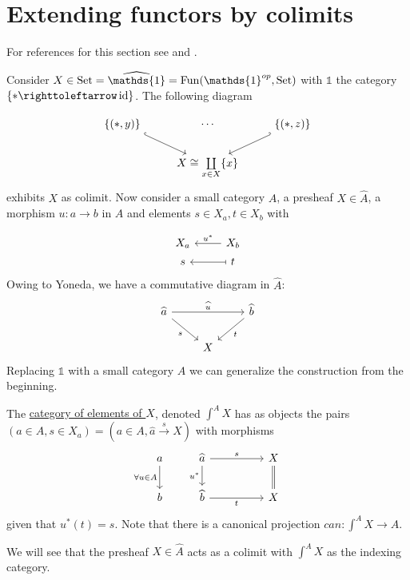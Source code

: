 \setcounter{section}{4}
\section{Extending functors by colimits}

For references for this section see \cite[Section 6.2]{LeinBasi2014} and \cite[Section 1.1]{Cisinski_2019}.

Consider $X\in\Set = \widehat{\mathds{1}}=\Fun(\mathds{1}^{op},\Set)$ with $\mathds{1}$  the category $\{\ast\righttoleftarrow \id\}$. The following diagram

\[\begin{tikzcd}
\{(\ast,y)\} \arrow[rd, hook] & \cdots                      & \{(\ast,z)\} \arrow[ld, hook'] \\
                 & X\cong\coprod\limits_{x\in X}\{x\} &                 
\end{tikzcd}\]
exhibits $X$ as colimit. Now consider a small category $A$, a presheaf $X\in \widehat{A}$, a morphism $u\colon a \to b$ in $A$ and elements $s\in X_a, t\in X_b$ with

\[
    \begin{tikzcd}[row sep= 2pt]
    X_a & X_b \arrow[l, "u^*"'] \\
    s   & t \arrow[l, maps to] 
    \end{tikzcd}
\]
Owing to Yoneda, we have a commutative diagram in $\widehat{A}$:
\[
\begin{tikzcd}
\widehat{a} \arrow[rd, "s"'] \arrow[rr, "\widehat{u}"] &   & \widehat{b} \arrow[ld, "t"] \\
                                               & X &                        
\end{tikzcd}
\]
Replacing $\mathds{1}$ with a small category $A$ we can generalize the construction from the beginning.
\begin{defi}
    The \underline{category of elements of $X$}, denoted $\int^A X$ has as objects the pairs $(a\in A, s\in X_a)=(a\in A, \widehat{a}\xrightarrow{s} X)$ with morphisms
    \[
        \begin{tikzcd}
        a \arrow[d, "\forall u\in A"'] & \widehat{a} \arrow[rr, "s"] \arrow[d, "u^*"'] && X \arrow[d, Rightarrow, no head] \\
        b                              & \widehat{b} \arrow[rr, "t"']                      && X                               
        \end{tikzcd}
    \]
    given that $u^*(t)=s.$ Note that there is a canonical projection $can\colon \int^A X \to A$.
\end{defi}
We will see that the presheaf $X\in \widehat{A}$ acts as a colimit with $\int^A X$ as the indexing category.


